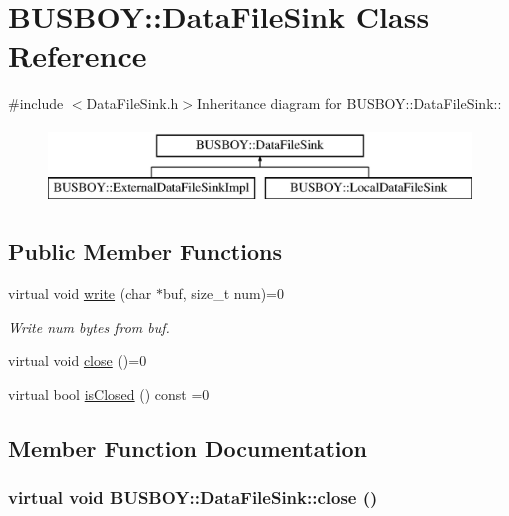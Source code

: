 \hypertarget{classBUSBOY_1_1DataFileSink}{
\section{BUSBOY::DataFileSink Class Reference}
\label{classBUSBOY_1_1DataFileSink}
}


{\ttfamily \#include $<$DataFileSink.h$>$}Inheritance diagram for BUSBOY::DataFileSink::\begin{figure}[H]
\begin{center}
\leavevmode
\includegraphics[height=2cm]{classBUSBOY_1_1DataFileSink}
\end{center}
\end{figure}
\subsection*{Public Member Functions}
\begin{DoxyCompactItemize}
\item 
virtual void \hyperlink{classBUSBOY_1_1DataFileSink_a5db7ff2ea8f54f197a99261a63fd2f9a}{write} (char $\ast$buf, size\_\-t num)=0
\begin{DoxyCompactList}\small\item\em Write num bytes from buf. \item\end{DoxyCompactList}\item 
virtual void \hyperlink{classBUSBOY_1_1DataFileSink_a353efcd57a43050fce1549d0be463b14}{close} ()=0
\item 
virtual bool \hyperlink{classBUSBOY_1_1DataFileSink_a0c3277901c45d1476b7b2cb8bc67664e}{isClosed} () const =0
\end{DoxyCompactItemize}


\subsection{Member Function Documentation}
\hypertarget{classBUSBOY_1_1DataFileSink_a353efcd57a43050fce1549d0be463b14}{
\subsubsection[{close}]{\setlength{\rightskip}{0pt plus 5cm}virtual void BUSBOY::DataFileSink::close ()}}
\label{classBUSBOY_1_1DataFileSink_a353efcd57a43050fce1549d0be463b14}


